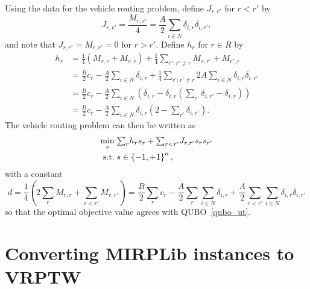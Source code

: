 \documentclass[11pt]{article}
\theoremstyle{definition}
\newcommand{\st}{\mathrm{s.t.}\;}
\newcommand{\set}[1]{\left\{ #1 \right\}}
\newcommand{\smallsum}{{\textstyle{\sum}}}
\newcommand{\0}{\mathbf{0}}
\begin{document}
Using the data for the vehicle routing problem, 
define $J_{r,r'}$ for $r < r'$ by
\[
	J_{r,r'} = \frac{M_{r,r'}}{4} = \frac{A}{2} \smallsum_{i \in N} \delta_{i,r}  \delta_{i,r'},
\]
and note that $J_{r,r'} = M_{r,r'} = 0$ for $r > r'$.
Define $h_r$ for $r \in R$ by 
\begin{align*}
	h_r &= \frac{1}{4} (M_{r,r} + M_{r,r}) + \frac{1}{4}\sum_{r' : r' \neq r} M_{r,r'} + M_{r',r} \\
		&= \frac{B}{2}c_r -  \frac{A}{2}\sum_{i \in N} \delta_{i,r} 
			+ \frac{1}{4}\sum_{r' : r' \neq r} 2A\smallsum_{i \in N} \delta_{i,r} \delta_{i,r'}\\
		&= \frac{B}{2}c_r - \frac{A}{2}\sum_{i \in N} 
			\left( \delta_{i,r} - 
					\delta_{i,r} \left(\smallsum_{r'} \delta_{i,r'} - \delta_{i,r}\right)\right)\\		
		&= \frac{B}{2}c_r - \frac{A}{2}\sum_{i \in N} \delta_{i,r} \left(2 - \smallsum_{r'} \delta_{i,r'}\right).
\end{align*}
The vehicle routing problem can then be written as
\begin{align}
\label{ising}
\min_s\; & \smallsum_r h_r s_r + \smallsum_{r < r'} J_{r,r'} s_r s_{r'} \\
\st
\notag & s \in \set{-1,+1}^n,
\end{align}
with a constant 
\[
d 	= \frac{1}{4}\left(2\smallsum_r M_{r,r} +  \smallsum_{r<r'} M_{r,r'} \right) 
	= \frac{B}{2} \smallsum_r c_r - \frac{A}{2} \smallsum_r \smallsum_{i \in N} \delta_{i,r}
		+ \frac{A}{2} \smallsum_{r < r'} \smallsum_{i \in N} \delta_{i,r} \delta_{i,r'}
\]
so that the optimal objective value agrees with QUBO~\eqref{qubo_ut}.

\section{Converting MIRPLib instances to VRPTW}
\end{document}
